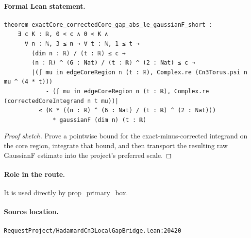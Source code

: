 \medskip
\paragraph{Formal Lean statement.}
\begin{verbatim}
theorem exactCore_correctedCore_gap_abs_le_gaussianF_short :
    ∃ c K : ℝ, 0 < c ∧ 0 < K ∧
      ∀ n : ℕ, 3 ≤ n → ∀ t : ℕ, 1 ≤ t →
        (dim n : ℝ) / (t : ℝ) ≤ c →
        (n : ℝ) ^ (6 : Nat) / (t : ℝ) ^ (2 : Nat) ≤ c →
        |(∫ mu in edgeCoreRegion n (t : ℝ), Complex.re (Cn3Torus.psi n mu ^ (4 * t)))
            - (∫ mu in edgeCoreRegion n (t : ℝ), Complex.re (correctedCoreIntegrand n t mu))|
          ≤ (K * ((n : ℝ) ^ (6 : Nat) / (t : ℝ) ^ (2 : Nat)))
              * gaussianF (dim n) (t : ℝ)
\end{verbatim}
\begin{proof}[Proof sketch]
Prove a pointwise bound for the exact-minus-corrected integrand on the core region, integrate that bound, and then transport the resulting raw GaussianF estimate into the project's preferred scale.
\end{proof}
\paragraph{Role in the route.}
It is used directly by prop\_primary\_box.
\paragraph{Source location.}
\texttt{RequestProject/HadamardCn3LocalGapBridge.lean:20420}
\medskip
